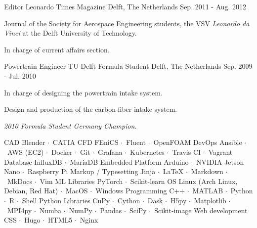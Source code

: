 \documentclass[11pt, a4paper]{awesome-cv}
\newcommand{\sep}{$\cdot$~}
\begin{document}
\newpage


\begin{cventries}

  \cventry
    {Editor} %
    {Leonardo Times Magazine} %
    {Delft, The Netherlands} %
    {Sep. 2011 - Aug. 2012} %
    {
      \begin{cvitems} %
        \item {Journal of the Society for Aerospace Engineering students, the VSV \textit{Leonardo da Vinci} at the Delft University of Technology.}
        \item {In charge of current affairs section.}
      \end{cvitems}
    }

  \cventry
    {Powertrain Engineer}
    {TU Delft Formula Student}
    {Delft, The Netherlands}
    {Sep. 2009 - Jul. 2010}
    {
      \begin{cvitems}
        \item {In charge of designing the powertrain intake system.}
        \item {Design and production of the carbon-fiber intake system.}
        \item {\textit{2010 Formula Student Germany Champion.}}
      \end{cvitems}
    }

\end{cventries}




\begin{cvskills}
  \cvskill
    {CAD}
    {Blender \sep CATIA}
  \cvskill
    {CFD}
    {FEniCS \sep Fluent \sep OpenFOAM}
  \cvskill
    {DevOps}
    {Ansible \sep AWS (EC2) \sep Docker \sep Git \sep Grafana \sep Kubernetes \sep Travis CI \sep Vagrant}
  \cvskill
    {Database}
    {InfluxDB \sep MariaDB}
  \cvskill
    {Embedded Platform}
    {Arduino \sep NVIDIA Jetson Nano \sep Raspberry Pi}
  \cvskill
    {Markup / Typesetting}
    {Jinja \sep LaTeX \sep Markdown \sep MkDocs \sep Vim}
  \cvskill
    {ML Libraries}
    {PyTorch \sep Scikit-learn}
  \cvskill
    {OS}
    {Linux (Arch Linux, Debian, Red Hat) \sep MacOS \sep Windows}
  \cvskill
    {Programming}
    {C++ \sep MATLAB \sep Python \sep R \sep Shell}
  \cvskill
    {Python Libraries}
    {CuPy \sep Cython \sep Dask \sep H5py \sep Matplotlib \sep MPI4py \sep Numba \sep NumPy \sep Pandas \sep SciPy \sep Scikit-image}
  \cvskill
    {Web development} %
    {CSS \sep Hugo \sep HTML5 \sep Nginx}
\end{cvskills}
\end{document}
